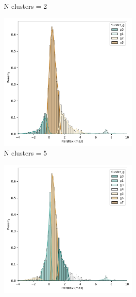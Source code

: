 \documentclass[11pt, a4paper, english]{book}
\begin{document}
\begin{figure}[htbp]
\begin{subfigure}{0.9\textwidth}
\begin{subfigure}[t]{0.3\textwidth}
      \caption{N clusters = 2}
    \end{subfigure}
    \hfill
    \begin{subfigure}[t]{0.3\textwidth}
      \centering
      \includegraphics[width=\textwidth]{../figures/kmeans_n5_parallax_melotte_22.pdf}
      \caption{N clusters = 5}
    \end{subfigure}
    \hfill
    \begin{subfigure}[t]{0.3\textwidth}
      \centering
      \includegraphics[width=\textwidth]{../figures/kmeans_n8_parallax_melotte_22.pdf}

\end{subfigure}
\end{subfigure}
\end{figure}
\end{document}
